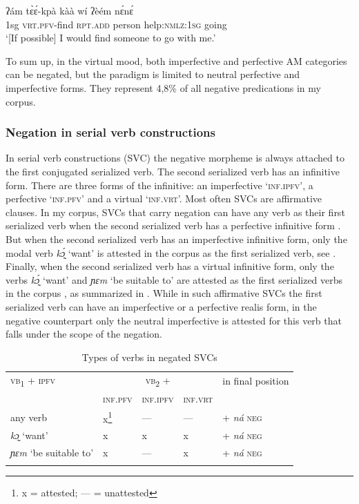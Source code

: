 \documentclass[output=paper,colorlinks=true, citecolor=brown]{langscibook}
\begin{document}
\ea\label{ex:gba:13}
    \gll ʔám tɛ̀ɛ́-kpà kàà wí ʔèém nɛ́nɛ́ \\ 
         1sg \textsc{vrt.pfv}-find \textsc{rpt.add} person help:\textsc{nmlz}:\textsc{1sg} going \\
    \glt ‘[If possible] I would find someone to go with me.’
\z 

To sum up, in the virtual mood, both imperfective and perfective AM categories can be negated, but the paradigm is limited to neutral perfective and imperfective forms. They represent 4,8\% of all negative predications in my corpus. 

\subsubsection{Negation in serial verb constructions}\label{sec:gba:2.1.3}

In serial verb constructions (SVC) the negative morpheme is always attached to the first conjugated serialized verb. The second serialized verb has an infinitive form. There are three forms of the infinitive: an imperfective ‘\textsc{inf.ipfv}’, a perfective ‘\textsc{inf.pfv}’ and a virtual ‘\textsc{inf.vrt}’.
Most often SVCs are affirmative clauses. In my corpus, SVCs that carry negation can have any verb as their first serialized verb when the second serialized verb has a perfective infinitive form . But when the second serialized verb has an imperfective infinitive form, only the modal verb \textit{kɔ̰́} ‘want’ is attested in the corpus as the first serialized verb, see . Finally, when the second serialized verb has a virtual infinitive form, only the verbs \textit{kɔ̰́} ‘want’ and \textit{ɲɛm} ‘be suitable to’ are attested as the first serialized verbs in the corpus , as summarized in . While in such affirmative SVCs the first serialized verb can have an imperfective or a perfective realis form, in the negative counterpart only the neutral imperfective is attested for this verb that falls under the scope of the negation.

\begin{table}
\begin{tabularx}{\textwidth}{lXXXl}
\lsptoprule
\textsc{vb}\textsubscript{1} + \textsc{ipfv} & \multicolumn{3}{c}{\textsc{vb}\textsubscript{2} +} & in final position\\
& \scshape inf.pfv & \scshape inf.ipfv & \scshape inf.vrt & \\
\midrule 
{any verb} & x\footnote{ x = attested; --- = unattested } & --- & --- & {+ \textit{ná} \textsc{neg}}\\ 
\textit{kɔ̰} ‘want’ & x & x & x & + \textit{ná} \textsc{neg}\\ 
\textit{ɲɛm} ‘be suitable to’ & x & --- & x & + \textit{ná} \textsc{neg}\\
\lspbottomrule
\end{tabularx}
    \caption{Types of verbs in negated SVCs }
    \label{tab:gba:2}
\end{table}
\end{document}
